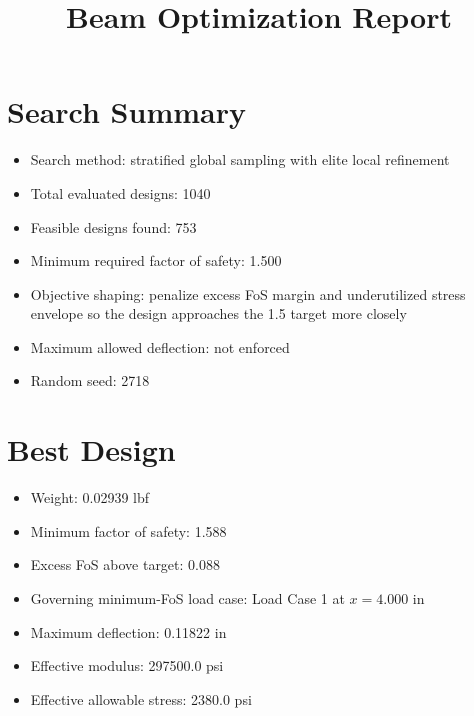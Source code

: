 \documentclass[11pt]{article}
\title{Beam Optimization Report}
\date{}
\begin{document}
\maketitle

\section*{Search Summary}
\begin{itemize}
\item Search method: stratified global sampling with elite local refinement
\item Total evaluated designs: 1040
\item Feasible designs found: 753
\item Minimum required factor of safety: 1.500
\item Objective shaping: penalize excess FoS margin and underutilized stress envelope so the design approaches the 1.5 target more closely
\item Maximum allowed deflection: not enforced
\item Random seed: 2718
\end{itemize}

\section*{Best Design}
\begin{itemize}
\item Weight: 0.02939 lbf
\item Minimum factor of safety: 1.588
\item Excess FoS above target: 0.088
\item Governing minimum-FoS load case: Load Case 1 at $x=4.000$ in
\item Maximum deflection: 0.11822 in
\item Effective modulus: 297500.0 psi
\item Effective allowable stress: 2380.0 psi
\end{itemize}
\end{document}
